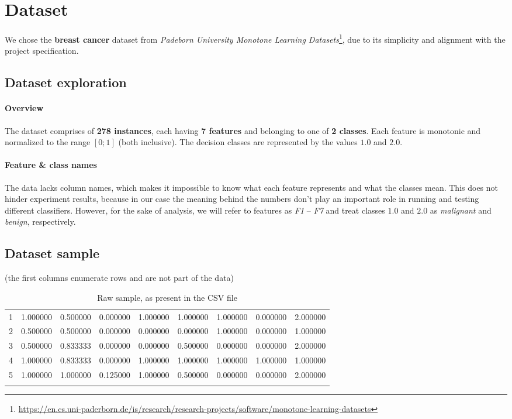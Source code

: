 \documentclass[../main.tex]{subfiles}
\begin{document}
\section{Dataset}
We chose the \textbf{breast cancer} dataset from \emph{Padeborn University
Monotone Learning
Datasets}\footnote{\url{https://en.cs.uni-paderborn.de/is/research/research-projects/software/monotone-learning-datasets}},
due to its simplicity and alignment with the project specification.

\subsection{Dataset exploration}
\paragraph{Overview} The dataset comprises of \textbf{278 instances}, each having \textbf{7 features}
and belonging to one of \textbf{2 classes}. Each feature is monotonic and
normalized to the range $\left[ 0; 1 \right]$ (both inclusive). The decision
classes are represented by the values $1.0$ and $2.0$.

\paragraph{Feature \& class names} The data lacks column names, which makes it
impossible to know what each feature represents and what the classes mean. This
does not hinder experiment results, because in our case the meaning behind the
numbers don't play an important role in running and testing different
classifiers. However, for the sake of analysis, we will refer to features as
\emph{F1} -- \emph{F7} and treat classes $1.0$ and $2.0$ as \emph{malignant} and
\emph{benign}, respectively.

\subsection{Dataset sample}

(the first columns enumerate rows and are not part of the data)

\begin{longtable}[c]{|r|n|n|n|n|n|n|n|l|}
	\endhead
	 & 1.000000 & 0.500000 & 0.000000 & 1.000000 & 1.000000 & 1.000000 & 0.000000 & 2.000000 \\
	2 & 0.500000 & 0.500000 & 0.000000 & 0.000000 & 0.000000 & 1.000000 & 0.000000 & 1.000000 \\
	3 & 0.500000 & 0.833333 & 0.000000 & 0.000000 & 0.500000 & 0.000000 & 0.000000 & 2.000000 \\
	4 & 1.000000 & 0.833333 & 0.000000 & 1.000000 & 1.000000 & 1.000000 & 1.000000 & 1.000000 \\
	5 & 1.000000 & 1.000000 & 0.125000 & 1.000000 & 0.500000 & 0.000000 & 0.000000 & 2.000000 \\
	\hline
	\caption{Raw sample, as present in the CSV file}
\end{longtable}
\end{document}
